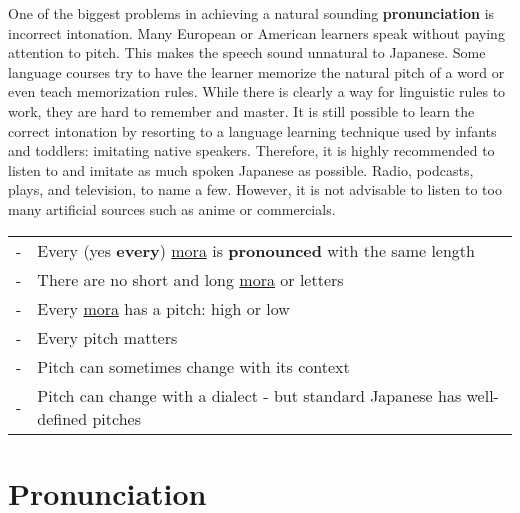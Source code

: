 One of the biggest problems in achieving a natural sounding
\textbf{pronunciation} is incorrect intonation. Many European or American
learners speak without paying attention to pitch. This makes the speech sound
unnatural to Japanese. Some language courses try to have the learner memorize
the natural pitch of a word or even teach memorization rules. While there is
clearly a way for linguistic rules to work, they are hard to remember and
master. It is still possible to learn the correct intonation by resorting to a
language learning technique used by infants and toddlers: imitating native
speakers. Therefore, it is highly recommended to listen to and imitate as much
spoken Japanese as possible. Radio, podcasts, plays, and television, to name a
few. However, it is not advisable to listen to too many artificial sources such
as anime or commercials.

\bigskip
\begin{tabular}{rl}
-&Every (yes \textbf{every}) \hyperref[sec:Mora]{mora} is \textbf{pronounced}
  with the same length\\
-&There are no short and long \hyperref[sec:Mora]{mora} or letters\\
-&Every \hyperref[sec:Mora]{mora} has a pitch: high or low\\
-&Every pitch matters\\
-&Pitch can sometimes change with its context\\
-&Pitch can change with a dialect - but standard Japanese has well-defined
  pitches\\
\end{tabular}

\bigskip

\section{Pronunciation}

